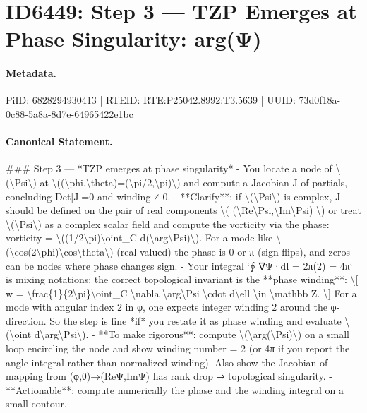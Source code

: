 \section*{ID6449: Step 3 — TZP Emerges at Phase Singularity: arg(Ψ)}
\paragraph{Metadata.}
PiID: 6828294930413 | RTEID: RTE:P25042.8992:T3.5639 | UUID: 73d0f18a-0c88-5a8a-8d7e-64965422e1bc

\paragraph{Canonical Statement.}
\#\#\# Step 3 — *TZP emerges at phase singularity* - You locate a node of \textbackslash{}(\textbackslash{}Psi\textbackslash{}) at \textbackslash{}((\textbackslash{}phi,\textbackslash{}theta)=(\textbackslash{}pi/2,\textbackslash{}pi)\textbackslash{}) and compute a Jacobian J of partials, concluding Det[J]=0 and winding ≠ 0. - **Clarify**: if \textbackslash{}(\textbackslash{}Psi\textbackslash{}) is complex, J should be defined on the pair of real components \textbackslash{}( (\textbackslash{}Re\textbackslash{}Psi,\textbackslash{}Im\textbackslash{}Psi) \textbackslash{}) or treat \textbackslash{}(\textbackslash{}Psi\textbackslash{}) as a complex scalar field and compute the vorticity via the phase: vorticity = \textbackslash{}((1/2\textbackslash{}pi)\textbackslash{}oint\_C d(\textbackslash{}arg\textbackslash{}Psi)\textbackslash{}). For a mode like \textbackslash{}(\textbackslash{}cos(2\textbackslash{}phi)\textbackslash{}cos\textbackslash{}theta\textbackslash{}) (real-valued) the phase is 0 or π (sign flips), and zeros can be nodes where phase changes sign. - Your integral `∮ ∇Ψ·dl = 2π(2) = 4π` is mixing notations: the correct topological invariant is the **phase winding**: \textbackslash{}[ w = \textbackslash{}frac\{1\}\{2\textbackslash{}pi\}\textbackslash{}oint\_C \textbackslash{}nabla \textbackslash{}arg\textbackslash{}Psi \textbackslash{}cdot d\textbackslash{}ell \textbackslash{}in \textbackslash{}mathbb Z. \textbackslash{}] For a mode with angular index 2 in φ, one expects integer winding 2 around the φ-direction. So the step is fine *if* you restate it as phase winding and evaluate \textbackslash{}(\textbackslash{}oint d\textbackslash{}arg\textbackslash{}Psi\textbackslash{}). - **To make rigorous**: compute \textbackslash{}(\textbackslash{}arg(\textbackslash{}Psi)\textbackslash{}) on a small loop encircling the node and show winding number = 2 (or 4π if you report the angle integral rather than normalized winding). Also show the Jacobian of mapping from (φ,θ)→(ReΨ,ImΨ) has rank drop ⇒ topological singularity. - **Actionable**: compute numerically the phase and the winding integral on a small contour.

